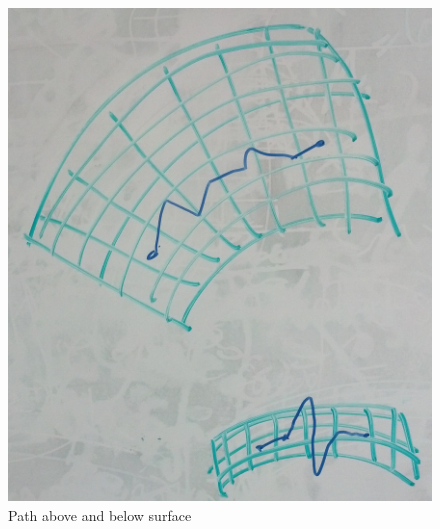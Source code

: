 \documentclass[conference]{acmsiggraph}
\begin{document}
\begin{figure}[ht]
\centering
\includegraphics[width=\columnwidth]{pathaboveandbelow.jpg}
\caption{Path above and below surface}
\label{pathsAboveAndBelow}
\end{figure}
\end{document}
